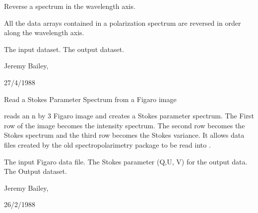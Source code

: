 \begin{manroutinedescription}
        Reverse a spectrum in the wavelength axis.

        All the data arrays contained in a polarization spectrum are
        reversed in order along the wavelength axis.

\begin{manparametertable}
  The input %
dataset.
  The %
output dataset.

\end{manparametertable}
         Jeremy Bailey, {}

         27/4/1988

\end{manroutinedescription}
\begin{manroutinedescription}
        Read a Stokes Parameter Spectrum from a Figaro image

        {} reads an n by 3 Figaro image and creates a {} Stokes
        parameter spectrum. The First row of the image becomes the
        intensity spectrum. The second row becomes the Stokes spectrum
        and the third row becomes the Stokes variance. It allows data
        files created by the old {} {} %
spectropolarimetry package
        to be read into {}.

\begin{manparametertable}
     The input Figaro data file.
     The Stokes parameter (Q,U,%
V) for the
                               output data.
  The %
Output dataset.

\end{manparametertable}
          Jeremy Bailey, {}

          26/2/1988

\end{manroutinedescription}
